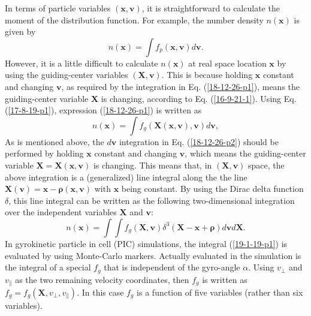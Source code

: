 \documentclass{article}
\newcommand{\tmmathbf}[1]{\ensuremath{\boldsymbol{#1}}}
\begin{document}
In terms of particle variables $(\mathbf{x}, \mathbf{v})$, it is
straightforward to calculate the moment of the distribution function. For
example, the number density $n (\mathbf{x})$ is given by
\begin{equation}
  \label{18-12-26-p1} n (\mathbf{x}) = \int f_p (\mathbf{x}, \mathbf{v})
  d\mathbf{v}.
\end{equation}
However, it is a little difficult to calculate $n (\mathbf{x})$ at real space
location $\mathbf{x}$ by using the guiding-center variables $(\mathbf{X},
\mathbf{v})$. This is because holding $\mathbf{x}$ constant and changing
$\mathbf{v}$, as required by the integration in Eq. (\ref{18-12-26-p1}), means
the guiding-center variable $\mathbf{X}$ is changing, according to Eq.
(\ref{16-9-21-1}). Using Eq. (\ref{17-8-19-p1}), expression
(\ref{18-12-26-p1}) is written as
\begin{equation}
  \label{18-12-26-p2} n (\mathbf{x}) = \int f_g (\mathbf{X} (\mathbf{x},
  \mathbf{v}), \mathbf{v}) d\mathbf{v},
\end{equation}
As is mentioned above, the $d\mathbf{v}$ integration in Eq.
(\ref{18-12-26-p2}) should be performed by holding $\mathbf{x}$ constant and
changing $\mathbf{v}$, which means the guiding-center variable
$\mathbf{X}=\mathbf{X} (\mathbf{x}, \mathbf{v})$ is changing. This means that,
in $(\mathbf{X}, \mathbf{v})$ space, the above integration is a (generalized)
line integral along the the line $\mathbf{X} (\mathbf{v})
=\mathbf{x}-\tmmathbf{\rho} (\mathbf{x}, \mathbf{v})$ with $\mathbf{x}$ being
constant. By using the Dirac delta function $\delta$, this line integral can
be written as the following two-dimensional integration over the independent
variables $\mathbf{X}$ and $\mathbf{v}$:
\begin{equation}
  \label{19-1-19-p1} n (\mathbf{x}) = \int \int f_g (\mathbf{X}, \mathbf{v})
  \delta^3 (\mathbf{X}-\mathbf{x}+\tmmathbf{\rho}) d\mathbf{v}d\mathbf{X}.
\end{equation}
In gyrokinetic particle in cell (PIC) simulations, the integral
(\ref{19-1-19-p1}) is evaluated by using Monte-Carlo markers. Actually
evaluated in the simulation is the integral of a special $f_g$ that is
independent of the gyro-angle $\alpha$. Using $v_{\perp}$ and $v_{\parallel}$
as the two remaining velocity coordinates, then $f_g$ is written as $f_g = f_g
(\mathbf{X}, v_{\perp}, v_{\parallel})$. In this case $f_g$ is a function of
five variables (rather than six variables).
\end{document}
